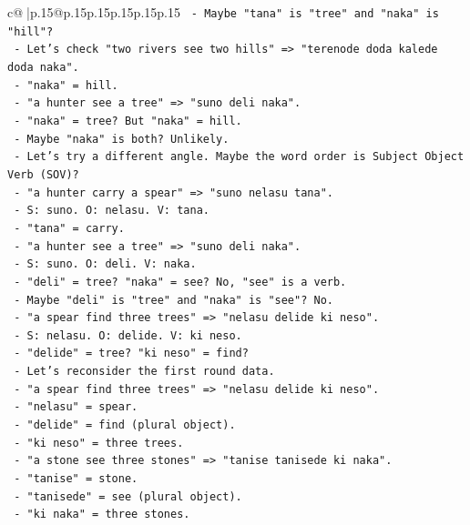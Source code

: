 \documentclass{article}
\begin{document}
{\begin{supertabular}{c@{$\;$}|p{.15\linewidth}@{}p{.15\linewidth}p{.15\linewidth}p{.15\linewidth}p{.15\linewidth}p{.15\linewidth}}
{{{\texttt{       {-} Maybe "tana" is "tree" and "naka" is "hill"?} \\
\texttt{       {-} Let's check "two rivers see two hills" => "terenode doda kalede doda naka".} \\
\texttt{         {-} "naka" = hill.} \\
\texttt{       {-} "a hunter see a tree" => "suno deli naka".} \\
\texttt{         {-} "naka" = tree? But "naka" = hill.} \\
\texttt{         {-} Maybe "naka" is both? Unlikely.} \\
\texttt{     {-} Let's try a different angle. Maybe the word order is Subject Object Verb (SOV)?} \\
\texttt{       {-} "a hunter carry a spear" => "suno nelasu tana".} \\
\texttt{         {-} S: suno. O: nelasu. V: tana.} \\
\texttt{         {-} "tana" = carry.} \\
\texttt{       {-} "a hunter see a tree" => "suno deli naka".} \\
\texttt{         {-} S: suno. O: deli. V: naka.} \\
\texttt{         {-} "deli" = tree? "naka" = see? No, "see" is a verb.} \\
\texttt{         {-} Maybe "deli" is "tree" and "naka" is "see"? No.} \\
\texttt{       {-} "a spear find three trees" => "nelasu delide ki neso".} \\
\texttt{         {-} S: nelasu. O: delide. V: ki neso.} \\
\texttt{         {-} "delide" = tree? "ki neso" = find?} \\
\texttt{     {-} Let's reconsider the first round data.} \\
\texttt{       {-} "a spear find three trees" => "nelasu delide ki neso".} \\
\texttt{         {-} "nelasu" = spear.} \\
\texttt{         {-} "delide" = find (plural object).} \\
\texttt{         {-} "ki neso" = three trees.} \\
\texttt{       {-} "a stone see three stones" => "tanise tanisede ki naka".} \\
\texttt{         {-} "tanise" = stone.} \\
\texttt{         {-} "tanisede" = see (plural object).} \\
\texttt{         {-} "ki naka" = three stones.} \\
}}}
\end{supertabular}}
\end{document}
